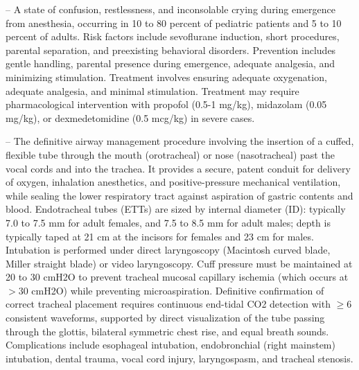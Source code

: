 -- A state of confusion, restlessness, and inconsolable crying during emergence from anesthesia, occurring in 10 to 80 percent of pediatric patients and 5 to 10 percent of adults. Risk factors include sevoflurane induction, short procedures, parental separation, and preexisting behavioral disorders. Prevention includes gentle handling, parental presence during emergence, adequate analgesia, and minimizing stimulation. Treatment involves ensuring adequate oxygenation, adequate analgesia, and minimal stimulation. Treatment may require pharmacological intervention with propofol (0.5-1 mg/kg), midazolam (0.05 mg/kg), or dexmedetomidine (0.5 mcg/kg) in severe cases.

-- The definitive airway management procedure involving the insertion of a cuffed, flexible tube through the mouth (orotracheal) or nose (nasotracheal) past the vocal cords and into the trachea. It provides a secure, patent conduit for delivery of oxygen, inhalation anesthetics, and positive-pressure mechanical ventilation, while sealing the lower respiratory tract against aspiration of gastric contents and blood. Endotracheal tubes (ETTs) are sized by internal diameter (ID): typically 7.0 to 7.5 mm for adult females, and 7.5 to 8.5 mm for adult males; depth is typically taped at 21 cm at the incisors for females and 23 cm for males. Intubation is performed under direct laryngoscopy (Macintosh curved blade, Miller straight blade) or video laryngoscopy. Cuff pressure must be maintained at 20 to 30 cmH2O to prevent tracheal mucosal capillary ischemia (which occurs at $>30$ cmH2O) while preventing microaspiration. Definitive confirmation of correct tracheal placement requires continuous end-tidal CO2 detection with $\ge 6$ consistent waveforms, supported by direct visualization of the tube passing through the glottis, bilateral symmetric chest rise, and equal breath sounds. Complications include esophageal intubation, endobronchial (right mainstem) intubation, dental trauma, vocal cord injury, laryngospasm, and tracheal stenosis.


